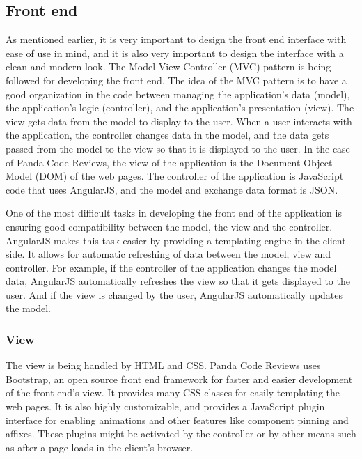 \subsection{Front end}

As mentioned earlier, it is very important to design the front end interface
with ease of use in mind, and it is also very important to design the interface
with a clean and modern look. The Model-View-Controller (MVC) pattern is being
followed for developing the front end. The idea of the MVC pattern is to have a
good organization in the code between managing the application's data (model),
the application's logic (controller), and the application's presentation (view).
The view gets data from the model to display to the user. When a user interacts
with the application, the controller changes data in the model, and the data
gets passed from the model to the view so that it is displayed to the user. In
the case of Panda Code Reviews, the view of the application is the Document
Object Model (DOM) of the web pages. The controller of the application is
JavaScript code that uses AngularJS\cite{angular}, and the model and exchange
data format is JSON.

One of the most difficult tasks in developing the front end of the application
is ensuring good compatibility between the model, the view and the controller.
AngularJS makes this task easier by providing a templating engine in the client
side. It allows for automatic refreshing of data between the model, view and
controller. For example, if the controller of the application changes the model
data, AngularJS automatically refreshes the view so that it gets displayed to
the user. And if the view is changed by the user, AngularJS automatically
updates the model.

\subsubsection{View}

The view is being handled by HTML and CSS. Panda Code Reviews uses
Bootstrap\cite{bootstrap}, an open source front end framework for faster and
easier development of the front end's view. It provides many CSS classes for
easily templating the web pages. It is also highly customizable, and provides a
JavaScript plugin interface for enabling animations and other features like
component pinning and affixes. These plugins might be activated by the
controller or by other means such as after a page loads in the client's browser.

